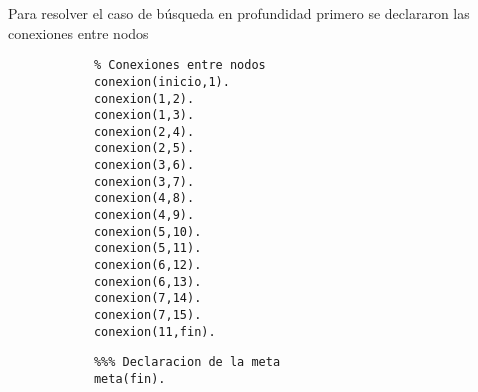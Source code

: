 \begin{solution}
    Para resolver el caso de búsqueda en profundidad primero se declararon las conexiones entre nodos
        \begin{verbatim}
            % Conexiones entre nodos
            conexion(inicio,1).
            conexion(1,2).
            conexion(1,3).
            conexion(2,4).
            conexion(2,5).
            conexion(3,6).
            conexion(3,7).
            conexion(4,8).
            conexion(4,9).
            conexion(5,10).
            conexion(5,11).
            conexion(6,12).
            conexion(6,13).
            conexion(7,14).
            conexion(7,15).
            conexion(11,fin).
        \end{verbatim}
        \begin{verbatim}
            %%% Declaracion de la meta
            meta(fin).
        \end{verbatim}
\end{solution}




\nocite{*}



